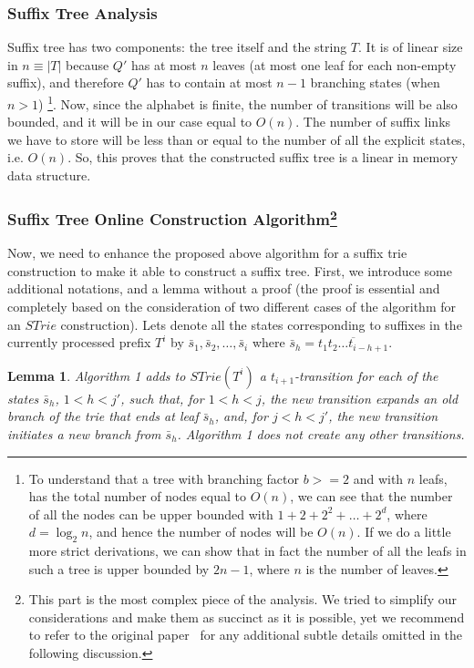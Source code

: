 \documentclass[paper=a4, fontsize=11pt]{scrartcl} %
\numberwithin{equation}{section} %
\numberwithin{figure}{section} %
\numberwithin{table}{section} %
\newtheorem{lemma}[theorem]{Lemma}
\begin{document}
\subsubsection{Suffix Tree Analysis}
\par Suffix tree has two components: the tree itself and the string $T$. It is of linear size in $n \equiv |T|$ because $Q'$ has at most $n$ leaves (at most one leaf for each non-empty suffix), and therefore $Q'$ has to contain at most $n - 1$ branching states (when $n > 1$) \footnote{To understand that a tree with branching factor $b >= 2$ and with $n$ leafs, has the total number of nodes equal to $O(n)$, we can see that the number of all the nodes can be upper bounded with $1 + 2 + 2^2 + \dots + 2^d$, where $d = \log_2n$, and hence the number of nodes will be $O(n)$. If we do a little more strict derivations, we can show that in fact the number of all the leafs in such a tree is upper bounded by $2n - 1$, where $n$ is the number of leaves.}. Now, since the alphabet is finite, the number of transitions will be also bounded, and it will be in our case equal to $O(n)$. The number of suffix links we have to store will be less than or equal to the number of all the explicit states, i.e. $O(n)$. So, this proves that the constructed suffix tree is a linear in memory data structure.

\subsubsection[Suffix Tree Online Construction Algorithm]{Suffix Tree Online Construction Algorithm\footnote{This part is the most complex piece of the analysis. We tried to simplify our considerations and make them as succinct as it is possible, yet we recommend to refer to the original paper~\cite{ukkonen1995line} for any additional subtle details omitted in the following discussion.}}
\par Now, we need to enhance the proposed above algorithm for a suffix trie construction to make it able to construct a suffix tree. First, we introduce some additional notations, and a lemma without a proof (the proof is essential and completely based on the consideration of two different cases of the algorithm for an $STrie$ construction). Lets denote all the states corresponding to suffixes in the currently processed prefix $T^i$ by $\bar s_1, \bar s_2, \dots, \bar s_i$ where $\bar s_h = \overline{t_1 t_2 \dots t_{i - h + 1}}$.

\begin{lemma}
\label{lemma:active-end-point}
Algorithm 1 adds to $STrie( T^i)$ a $t_{i+1}$-transition for each of the states $\bar{s}_h$,
$1 < h < j'$, such that, for $1 < h < j$, the new transition expands an old branch of
the trie that ends at leaf $\bar{s}_h$, and, for $j < h < j'$, the new transition initiates a new branch from $\bar{s}_h$. Algorithm 1 does not create any other transitions.
\end{lemma}
\end{document}
